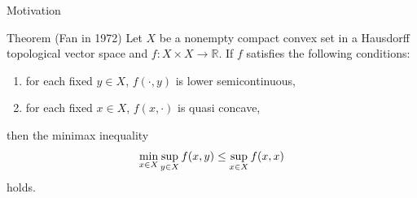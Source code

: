 \documentclass[aspectratio=169, dvipdfmx, 11pt]{beamer}
\newcommand{\RealNumberSet}{\mathbb{R}}
\begin{document}
\begin{frame}{Motivation}
  \begin{block}{Theorem (Fan \cite{MR341029} in 1972)}
    Let $X$ be a nonempty compact convex set in a Hausdorff topological vector space and $f \colon X \times X \to \RealNumberSet$. If $f$ satisfies
    the following conditions:
    \begin{enumerate}
      \item for each fixed $y \in X$, $f(\cdot,y)$ is lower semicontinuous,
      \item for each fixed $x \in X$, $f(x,\cdot)$ is quasi concave,
    \end{enumerate}
    then the minimax inequality
    \begin{equation}
      \min_{x \in X} \sup_{y \in X} f(x,y) \leq \sup_{x \in X} f(x,x) \notag
    \end{equation}
    holds.
  \end{block}
\end{frame}
\end{document}
